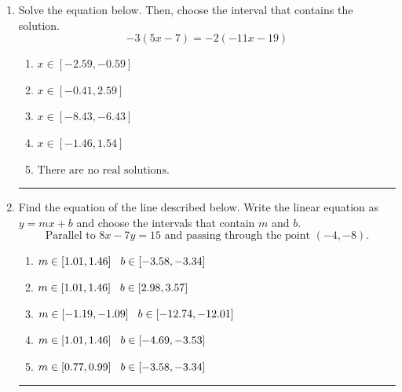 \documentclass[14pt]{extbook}
\newcommand{\litem}[1]{\item#1\hspace*{-1cm}\rule{\textwidth}{0.4pt}}
\begin{document}
\begin{enumerate}
{\begin{enumerate}[label=\Alph*.]
\end{enumerate} }
\litem{
Solve the equation below. Then, choose the interval that contains the solution.\[ -3(5x -7) = -2(-11x -19) \]\begin{enumerate}[label=\Alph*.]
\item \( x \in [-2.59, -0.59] \)
\item \( x \in [-0.41, 2.59] \)
\item \( x \in [-8.43, -6.43] \)
\item \( x \in [-1.46, 1.54] \)
\item \( \text{There are no real solutions.} \)

\end{enumerate} }
\litem{
Find the equation of the line described below. Write the linear equation as $ y=mx+b $ and choose the intervals that contain $m$ and $b$.\[ \text{Parallel to } 8 x - 7 y = 15 \text{ and passing through the point } (-4, -8). \]\begin{enumerate}[label=\Alph*.]
\item \( m \in [1.01, 1.46] \hspace*{3mm} b \in [-3.58, -3.34] \)
\item \( m \in [1.01, 1.46] \hspace*{3mm} b \in [2.98, 3.57] \)
\item \( m \in [-1.19, -1.09] \hspace*{3mm} b \in [-12.74, -12.01] \)
\item \( m \in [1.01, 1.46] \hspace*{3mm} b \in [-4.69, -3.53] \)
\item \( m \in [0.77, 0.99] \hspace*{3mm} b \in [-3.58, -3.34] \)


\end{enumerate}}
\end{enumerate}
\end{document}
